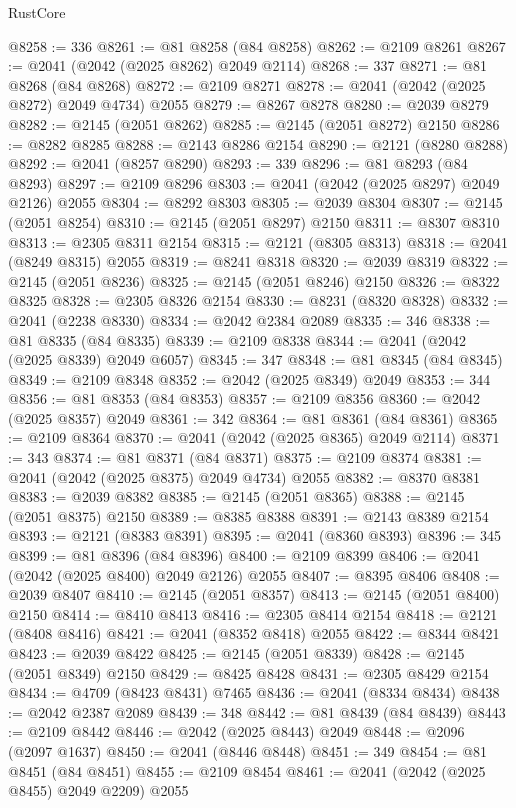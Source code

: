 \begin{lexlean}{RustCore}
\begin{coremodule}
@8258 := 336
@8261 := @81 @8258 (@84 @8258)
@8262 := @2109 @8261
@8267 := @2041 (@2042 (@2025 @8262) @2049 @2114)
@8268 := 337
@8271 := @81 @8268 (@84 @8268)
@8272 := @2109 @8271
@8278 := @2041 (@2042 (@2025 @8272) @2049 @4734) @2055
@8279 := @8267 @8278
@8280 := @2039 @8279
@8282 := @2145 (@2051 @8262)
@8285 := @2145 (@2051 @8272) @2150
@8286 := @8282 @8285
@8288 := @2143 @8286 @2154
@8290 := @2121 (@8280 @8288)
@8292 := @2041 (@8257 @8290)
@8293 := 339
@8296 := @81 @8293 (@84 @8293)
@8297 := @2109 @8296
@8303 := @2041 (@2042 (@2025 @8297) @2049 @2126) @2055
@8304 := @8292 @8303
@8305 := @2039 @8304
@8307 := @2145 (@2051 @8254)
@8310 := @2145 (@2051 @8297) @2150
@8311 := @8307 @8310
@8313 := @2305 @8311 @2154
@8315 := @2121 (@8305 @8313)
@8318 := @2041 (@8249 @8315) @2055
@8319 := @8241 @8318
@8320 := @2039 @8319
@8322 := @2145 (@2051 @8236)
@8325 := @2145 (@2051 @8246) @2150
@8326 := @8322 @8325
@8328 := @2305 @8326 @2154
@8330 := @8231 (@8320 @8328)
@8332 := @2041 (@2238 @8330)
@8334 := @2042 @2384 @2089
@8335 := 346
@8338 := @81 @8335 (@84 @8335)
@8339 := @2109 @8338
@8344 := @2041 (@2042 (@2025 @8339) @2049 @6057)
@8345 := 347
@8348 := @81 @8345 (@84 @8345)
@8349 := @2109 @8348
@8352 := @2042 (@2025 @8349) @2049
@8353 := 344
@8356 := @81 @8353 (@84 @8353)
@8357 := @2109 @8356
@8360 := @2042 (@2025 @8357) @2049
@8361 := 342
@8364 := @81 @8361 (@84 @8361)
@8365 := @2109 @8364
@8370 := @2041 (@2042 (@2025 @8365) @2049 @2114)
@8371 := 343
@8374 := @81 @8371 (@84 @8371)
@8375 := @2109 @8374
@8381 := @2041 (@2042 (@2025 @8375) @2049 @4734) @2055
@8382 := @8370 @8381
@8383 := @2039 @8382
@8385 := @2145 (@2051 @8365)
@8388 := @2145 (@2051 @8375) @2150
@8389 := @8385 @8388
@8391 := @2143 @8389 @2154
@8393 := @2121 (@8383 @8391)
@8395 := @2041 (@8360 @8393)
@8396 := 345
@8399 := @81 @8396 (@84 @8396)
@8400 := @2109 @8399
@8406 := @2041 (@2042 (@2025 @8400) @2049 @2126) @2055
@8407 := @8395 @8406
@8408 := @2039 @8407
@8410 := @2145 (@2051 @8357)
@8413 := @2145 (@2051 @8400) @2150
@8414 := @8410 @8413
@8416 := @2305 @8414 @2154
@8418 := @2121 (@8408 @8416)
@8421 := @2041 (@8352 @8418) @2055
@8422 := @8344 @8421
@8423 := @2039 @8422
@8425 := @2145 (@2051 @8339)
@8428 := @2145 (@2051 @8349) @2150
@8429 := @8425 @8428
@8431 := @2305 @8429 @2154
@8434 := @4709 (@8423 @8431) @7465
@8436 := @2041 (@8334 @8434)
@8438 := @2042 @2387 @2089
@8439 := 348
@8442 := @81 @8439 (@84 @8439)
@8443 := @2109 @8442
@8446 := @2042 (@2025 @8443) @2049
@8448 := @2096 (@2097 @1637)
@8450 := @2041 (@8446 @8448)
@8451 := 349
@8454 := @81 @8451 (@84 @8451)
@8455 := @2109 @8454
@8461 := @2041 (@2042 (@2025 @8455) @2049 @2209) @2055

\end{coremodule}
\end{lexlean}
